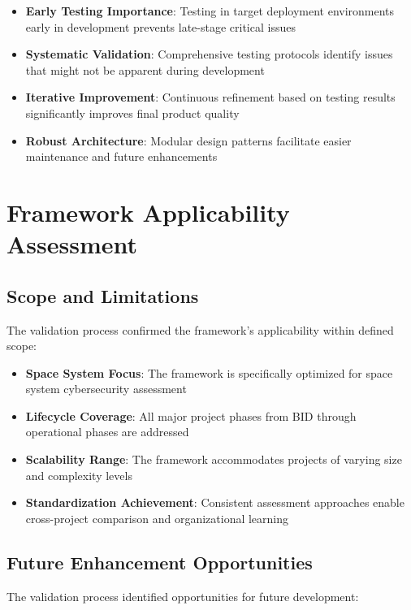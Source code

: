 \documentclass[binding=0.6cm]{sapthesis}
\begin{document}
\begin{itemize}
    \item \textbf{Early Testing Importance}: Testing in target deployment environments early in development prevents late-stage critical issues
    \item \textbf{Systematic Validation}: Comprehensive testing protocols identify issues that might not be apparent during development
    \item \textbf{Iterative Improvement}: Continuous refinement based on testing results significantly improves final product quality
    \item \textbf{Robust Architecture}: Modular design patterns facilitate easier maintenance and future enhancements
\end{itemize}

\section{Framework Applicability Assessment}

\subsection{Scope and Limitations}

The validation process confirmed the framework's applicability within defined scope:

\begin{itemize}
    \item \textbf{Space System Focus}: The framework is specifically optimized for space system cybersecurity assessment
    \item \textbf{Lifecycle Coverage}: All major project phases from BID through operational phases are addressed
    \item \textbf{Scalability Range}: The framework accommodates projects of varying size and complexity levels
    \item \textbf{Standardization Achievement}: Consistent assessment approaches enable cross-project comparison and organizational learning
\end{itemize}

\subsection{Future Enhancement Opportunities}

The validation process identified opportunities for future development:
\end{document}
